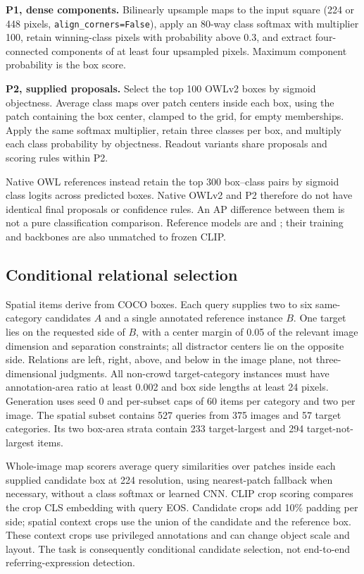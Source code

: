 \documentclass[10pt,twocolumn,letterpaper]{article}
\begin{document}
\textbf{P1, dense components.} Bilinearly upsample maps to the input
square (224 or 448 pixels, \texttt{align\_corners=False}), apply an
80-way class softmax with multiplier 100, retain winning-class pixels
with probability above 0.3, and extract four-connected components of at
least four upsampled pixels. Maximum component probability is the box
score.

\textbf{P2, supplied proposals.} Select the top 100 OWLv2 boxes by
sigmoid objectness. Average class maps over patch centers inside each
box, using the patch containing the box center, clamped to the grid, for
empty memberships. Apply the same softmax multiplier, retain three
classes per box, and multiply each class probability by objectness.
Readout variants share proposals and scoring rules within P2.

Native OWL references instead retain the top 300 box--class pairs by
sigmoid class logits across predicted boxes. Native OWLv2 and P2
therefore do not have identical final proposals or confidence rules. An
AP difference between them is not a pure classification comparison.
Reference models are  and
; their training and
backbones are also unmatched to frozen CLIP.

\subsection{Conditional relational
selection}\label{conditional-relational-selection}

Spatial items derive from COCO boxes. Each query supplies two to six
same-category candidates \(A\) and a single annotated reference instance
\(B\). One target lies on the requested side of \(B\), with a center
margin of 0.05 of the relevant image dimension and separation
constraints; all distractor centers lie on the opposite side. Relations
are left, right, above, and below in the image plane, not
three-dimensional judgments. All non-crowd target-category instances
must have annotation-area ratio at least 0.002 and box side lengths at
least 24 pixels. Generation uses seed 0 and per-subset caps of 60 items
per category and two per image. The spatial subset contains 527 queries
from 375 images and 57 target categories. Its two box-area strata
contain 233 target-largest and 294 target-not-largest items.

Whole-image map scorers average query similarities over patches inside
each supplied candidate box at 224 resolution, using nearest-patch
fallback when necessary, without a class softmax or learned CNN. CLIP
crop scoring compares the crop CLS embedding with query EOS. Candidate
crops add 10\% padding per side; spatial context crops use the union of
the candidate and the reference box. These context crops use privileged
annotations and can change object scale and layout. The task is
consequently conditional candidate selection, not end-to-end
referring-expression detection.
\end{document}
